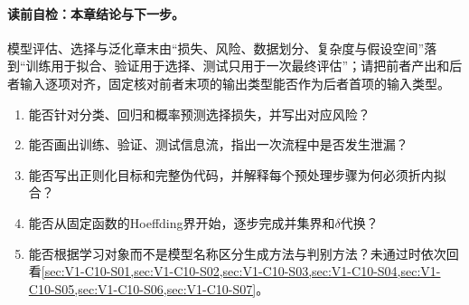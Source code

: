 \begin{SLChapterExercisePairSection}
\end{SLChapterExercisePairSection}

\paragraph{读前自检：本章结论与下一步。}模型评估、选择与泛化章末由“损失、风险、数据划分、复杂度与假设空间”落到“训练用于拟合、验证用于选择、测试只用于一次最终评估”；请把前者产出和后者输入逐项对齐，固定核对前者末项的输出类型能否作为后者首项的输入类型。\par

\begin{SLCompactClosure}
\label{struct:V1-C10-CH36}

\label{struct:V1-C10-CH37}
\begin{selfcheckbox}
\begin{enumerate}[leftmargin=2.2em]
  \item 能否针对分类、回归和概率预测选择损失，并写出对应风险？
  \item 能否画出训练、验证、测试信息流，指出一次流程中是否发生泄漏？
  \item 能否写出正则化目标和完整\kFold{}伪代码，并解释每个预处理步骤为何必须折内拟合？
  \item 能否从固定函数的Hoeffding界开始，逐步完成并集界和$\delta$代换？
  \item 能否根据学习对象而不是模型名称区分生成方法与判别方法？未通过时依次回看\cref{sec:V1-C10-S01,sec:V1-C10-S02,sec:V1-C10-S03,sec:V1-C10-S04,sec:V1-C10-S05,sec:V1-C10-S06,sec:V1-C10-S07}。
\end{enumerate}
\end{selfcheckbox}
\end{SLCompactClosure}
